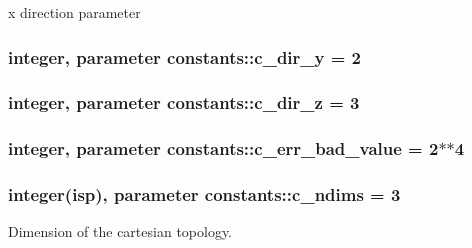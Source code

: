 x direction parameter 

\subsubsection[{\texorpdfstring{c\+\_\+dir\+\_\+y}{c_dir_y}}]{\setlength{\rightskip}{0pt plus 5cm}integer, parameter constants\+::c\+\_\+dir\+\_\+y = 2}\hypertarget{namespaceconstants_a5d84bc6ed2e3bd7b6e64704dc587825b}{}\label{namespaceconstants_a5d84bc6ed2e3bd7b6e64704dc587825b}
\subsubsection[{\texorpdfstring{c\+\_\+dir\+\_\+z}{c_dir_z}}]{\setlength{\rightskip}{0pt plus 5cm}integer, parameter constants\+::c\+\_\+dir\+\_\+z = 3}\hypertarget{namespaceconstants_a9d2fa70332164d956c148a895e769983}{}\label{namespaceconstants_a9d2fa70332164d956c148a895e769983}
\subsubsection[{\texorpdfstring{c\+\_\+err\+\_\+bad\+\_\+value}{c_err_bad_value}}]{\setlength{\rightskip}{0pt plus 5cm}integer, parameter constants\+::c\+\_\+err\+\_\+bad\+\_\+value = 2$\ast$$\ast$4}\hypertarget{namespaceconstants_a0c96dab545557ad23bf55d7576f5405f}{}\label{namespaceconstants_a0c96dab545557ad23bf55d7576f5405f}
\subsubsection[{\texorpdfstring{c\+\_\+ndims}{c_ndims}}]{\setlength{\rightskip}{0pt plus 5cm}integer({\bf isp}), parameter constants\+::c\+\_\+ndims = 3}\hypertarget{namespaceconstants_aad8d45b739c41f2926fd2accb3de9dd2}{}\label{namespaceconstants_aad8d45b739c41f2926fd2accb3de9dd2}


Dimension of the cartesian topology. 

